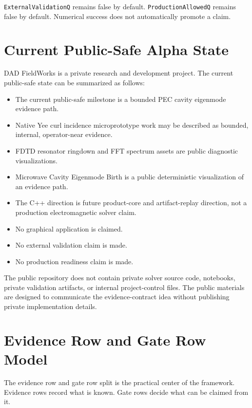 \documentclass[11pt,a4paper]{article}
\newcommand{\code}[1]{\texttt{#1}}
\begin{document}
\code{ExternalValidationQ} remains false by default. \code{ProductionAllowedQ} remains false by default. Numerical success does not automatically promote a claim.

\section{Current Public-Safe Alpha State}

DAD FieldWorks is a private research and development project. The current public-safe state can be summarized as follows:

\begin{itemize}
  \item The current public-safe milestone is a bounded PEC cavity eigenmode evidence path.
  \item Native Yee curl incidence microprototype work may be described as bounded, internal, operator-near evidence.
  \item FDTD resonator ringdown and FFT spectrum assets are public diagnostic visualizations.
  \item Microwave Cavity Eigenmode Birth is a public deterministic visualization of an evidence path.
  \item The C++ direction is future product-core and artifact-replay direction, not a production electromagnetic solver claim.
  \item No graphical application is claimed.
  \item No external validation claim is made.
  \item No production readiness claim is made.
\end{itemize}

The public repository does not contain private solver source code, notebooks, private validation artifacts, or internal project-control files. The public materials are designed to communicate the evidence-contract idea without publishing private implementation details.

\section{Evidence Row and Gate Row Model}

The evidence row and gate row split is the practical center of the framework. Evidence rows record what is known. Gate rows decide what can be claimed from it.
\end{document}
